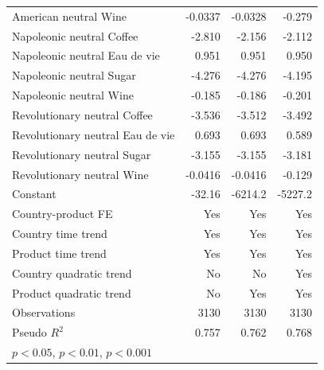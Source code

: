 \documentclass[12pt,a4paper,titlepage]{article}
\begin{document}
\begin{table}[htbp]
\begin{tabular}{l*{3}{D{.}{.}{-1}}}
American neutral Wine&     -0.0337         &     -0.0328         &      -0.279\sym{*}  \\
Napoleonic neutral Coffee&      -2.810\sym{***}&      -2.156\sym{***}&      -2.112\sym{***}\\
Napoleonic neutral Eau de vie&       0.951\sym{***}&       0.951\sym{***}&       0.950\sym{***}\\
Napoleonic neutral Sugar&      -4.276\sym{***}&      -4.276\sym{***}&      -4.195\sym{***}\\
Napoleonic neutral Wine&      -0.185         &      -0.186         &      -0.201         \\
Revolutionary neutral Coffee&      -3.536\sym{***}&      -3.512\sym{***}&      -3.492\sym{***}\\
Revolutionary neutral Eau de vie&       0.693\sym{**} &       0.693\sym{**} &       0.589\sym{**} \\
Revolutionary neutral Sugar&      -3.155\sym{***}&      -3.155\sym{***}&      -3.181\sym{***}\\
Revolutionary neutral Wine&     -0.0416         &     -0.0416         &      -0.129         \\
Constant            &      -32.16\sym{**} &     -6214.2\sym{***}&     -5227.2\sym{***}\\
Country-product FE  &         Yes         &         Yes         &         Yes         \\
Country time trend  &         Yes         &         Yes         &         Yes         \\
Product time trend  &         Yes         &         Yes         &         Yes         \\
Country quadratic trend&          No         &          No         &         Yes         \\
Product quadratic trend&          No         &         Yes         &         Yes         \\
\hline
Observations        &        3130         &        3130         &        3130         \\
Pseudo \(R^{2}\)    &       0.757         &       0.762         &       0.768         \\
\hline\hline
{}\\
\end{tabular}
\end{table}
\end{document}
